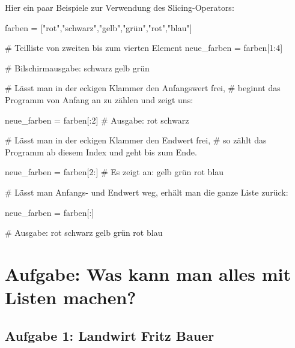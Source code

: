 \documentclass{\VorlagenPfad/coderdojokatext}
\begin{document}
Hier ein paar Beispiele zur Verwendung des Slicing-Operators:
\begin{pythoncode}
farben = ["rot","schwarz","gelb","grün","rot","blau"]

# Teilliste von zweiten bis zum vierten Element
neue_farben = farben[1:4]	

# Bilschirmausgabe: schwarz gelb grün	

# Lässt man in der eckigen Klammer den Anfangswert frei, 
# beginnt das Programm von Anfang an zu zählen und zeigt uns:

neue_farben = farben[:2]
# Ausgabe: rot schwarz

# Lässt man in der eckigen Klammer den Endwert frei,
# so zählt das Programm ab diesem Index und geht bis zum Ende. 

neue_farben = farben[2:]
# Es zeigt an: gelb grün rot blau

# Lässt man Anfangs- und Endwert weg, erhält man die ganze Liste zurück:

neue_farben = farben[:] 

# Ausgabe: rot schwarz gelb grün rot blau
\end{pythoncode}


\section{Aufgabe:  Was kann man alles mit Listen machen?}

\subsection{Aufgabe 1: Landwirt Fritz Bauer}
\end{document}
